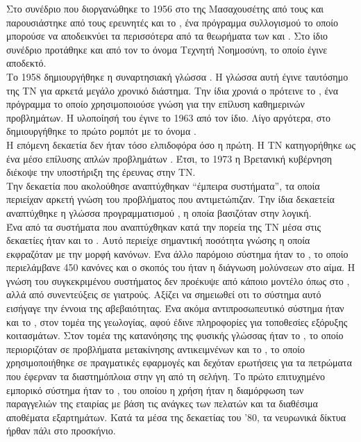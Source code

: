 Στο συνέδριο που διοργανώθηκε το 1956 στο {} της
Μασαχουσέτης από τους {} 
και {} παρουσιάστηκε από τους ερευνητές {} και
{} το {}, ένα πρόγραμμα συλλογισμού το οποίο
μπορούσε να αποδεικνύει τα περισσότερα από τα θεωρήματα των {} και {}. 
Στο ίδιο συνέδριο προτάθηκε και από τον {} το όνομα Τεχνητή Νοημοσύνη, το οποίο έγινε αποδεκτό. \\

Το 1958 δημιουργήθηκε η συναρτησιακή γλώσσα {}. 
Η γλώσσα αυτή έγινε ταυτόσημο της ΤΝ για αρκετά μεγάλο χρονικό διάστημα. 
Την ίδια χρονιά ο {} πρότεινε το {}, ένα πρόγραμμα το οποίο χρησιμοποιούσε
γνώση για την επίλυση καθημερινών προβλημάτων. 
Η υλοποίησή του έγινε το 1963 από τον ίδιο.
Λίγο αργότερα, στο {} δημιουργήθηκε το πρώτο ρομπότ με το όνομα {}. \\

Η επόμενη δεκαετία δεν ήταν τόσο ελπιδοφόρα όσο η πρώτη. Η ΤΝ κατηγορήθηκε ως ένα μέσο επίλυσης απλών προβλημάτων
{}. Έτσι, το 1973 η Βρετανική κυβέρνηση διέκοψε την υποστήριξη της έρευνας στην ΤΝ. \\

Την δεκαετία που ακολούθησε αναπτύχθηκαν “έμπειρα συστήματα”, τα οποία περιείχαν αρκετή γνώση του προβλήματος που αντιμετώπιζαν. 
Την ίδια δεκαετεία αναπτύχθηκε η γλώσσα προγραμματισμού {}, η οποία βασιζόταν στην λογική. \\

Ένα από τα συστήματα που αναπτύχθηκαν κατά την πορεία της ΤΝ μέσα στις δεκαετίες ήταν και το {}. 
Αυτό περιείχε σημαντική ποσότητα γνώσης η οποία εκφραζόταν με την μορφή κανόνων. 
Ένα άλλο παρόμοιο σύστημα ήταν το {}, το οποίο περιελάμβανε 450 κανόνες 
και ο σκοπός του ήταν η διάγνωση μολύνσεων στο αίμα.
Η γνώση του συγκεκριμένου συστήματος δεν προέκυψε από κάποιο μοντέλο όπως στο {}, 
αλλά από συνεντεύξεις σε γιατρούς. 
Αξίζει να σημειωθεί οτι το σύστημα αυτό εισήγαγε την έννοια της αβεβαιότητας.
Ένα ακόμα αντιπροσωπευτικό σύστημα ήταν και το {}, στον τομέα της γεωλογίας, 
αφού έδινε πληροφορίες για τοποθεσίες εξόρυξης κοιτασμάτων.
Στον τομέα της κατανόησης της φυσικής γλώσσας ήταν το {}, το οποίο
περιοριζόταν σε προβλήματα μετακίνησης αντικειμνένων και το {}, το οποίο
χρησιμοποιήθηκε σε πραγματικές εφαρμογές και δεχόταν ερωτήσεις για τα
πετρώματα που έφερναν τα διαστημόπλοια {} στην γη από τη σελήνη. 
Το πρώτο επιτυχημένο εμπορικό σύστημα ήταν το {}, 
του οποίου η χρήση ήταν η διαμόρφωση των παραγγελιών της εταιρίας {} με βάση τις ανάγκες των πελατών και τα διαθέσιμα αποθέματα εξαρτημάτων. 
Κατά τα μέσα της δεκαετίας του '80, τα νευρωνικά δίκτυα ήρθαν πάλι στο προσκήνιο. \\

